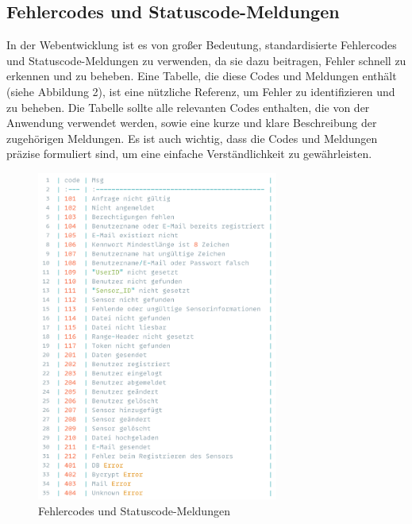 \subsection{Fehlercodes und Statuscode-Meldungen}\label{appendix:a8}\par
In der Webentwicklung ist es von großer Bedeutung,
standardisierte Fehlercodes und Statuscode-Meldungen zu verwenden, da sie dazu beitragen, Fehler schnell zu erkennen und zu beheben. Eine Tabelle, die diese Codes und Meldungen enthält (siehe Abbildung 2), ist eine nützliche Referenz, um Fehler zu identifizieren und zu beheben. Die Tabelle sollte alle relevanten Codes enthalten, die von der Anwendung verwendet werden, sowie eine kurze und klare Beschreibung der zugehörigen Meldungen. Es ist auch wichtig, dass die Codes und Meldungen präzise formuliert sind, um eine einfache Verständlichkeit zu gewährleisten.
\begin{figure}[htbp]
	\includegraphics[width=300px]{img/Statuscode-Meldungen.png}
	\caption{Fehlercodes und Statuscode-Meldungen}
\end{figure}

\clearpage

